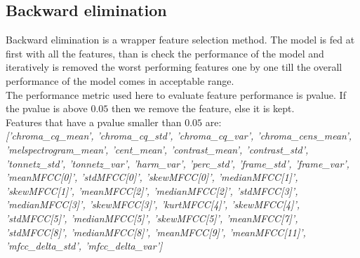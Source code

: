 \subsection{Backward elimination}
Backward elimination is a wrapper feature selection method. The model is fed at first with all the features, than is check the performance of the model and iteratively is removed the worst performing features one by one till the overall performance of the model comes in acceptable range.
\\
The performance metric used here to evaluate feature performance is pvalue. If the pvalue is above $0.05$ then we remove the feature, else it is kept.
\\
Features that have a pvalue smaller than $0.05$ are:
\\ \linebreak 
\textit{['chroma\_cq\_mean', 'chroma\_cq\_std', 'chroma\_cq\_var', 'chroma\_cens\_mean', 'melspectrogram\_mean', 'cent\_mean', 'contrast\_mean', 'contrast\_std', 'tonnetz\_std', 'tonnetz\_var', 'harm\_var', 'perc\_std', 'frame\_std', 'frame\_var', 'meanMFCC[0]', 'stdMFCC[0]', 'skewMFCC[0]', 'medianMFCC[1]', 'skewMFCC[1]', 'meanMFCC[2]', 'medianMFCC[2]', 'stdMFCC[3]', 'medianMFCC[3]', 'skewMFCC[3]', 'kurtMFCC[4]', 'skewMFCC[4]', 'stdMFCC[5]', 'medianMFCC[5]', 'skewMFCC[5]', 'meanMFCC[7]', 'stdMFCC[8]', 'medianMFCC[8]', 'meanMFCC[9]', 'meanMFCC[11]', 'mfcc\_delta\_std', 'mfcc\_delta\_var']}

